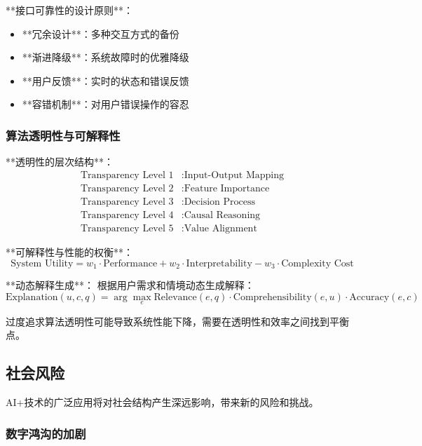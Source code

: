 **接口可靠性的设计原则**：
\begin{itemize}
\item **冗余设计**：多种交互方式的备份
\item **渐进降级**：系统故障时的优雅降级
\item **用户反馈**：实时的状态和错误反馈
\item **容错机制**：对用户错误操作的容忍
\end{itemize}

\subsubsection{算法透明性与可解释性} %

**透明性的层次结构**：
\begin{align}
\text{Transparency Level 1} &: \text{Input-Output Mapping} \\
\text{Transparency Level 2} &: \text{Feature Importance} \\
\text{Transparency Level 3} &: \text{Decision Process} \\
\text{Transparency Level 4} &: \text{Causal Reasoning} \\
\text{Transparency Level 5} &: \text{Value Alignment}
\end{align}

**可解释性与性能的权衡**：
\begin{equation}
\text{System Utility} = w_1 \cdot \text{Performance} + w_2 \cdot \text{Interpretability} - w_3 \cdot \text{Complexity Cost}
\end{equation}

**动态解释生成**：
根据用户需求和情境动态生成解释：
\begin{equation}
\text{Explanation}(u, c, q) = \arg\max_{e} \text{Relevance}(e, q) \cdot \text{Comprehensibility}(e, u) \cdot \text{Accuracy}(e, c)
\end{equation}

\begin{center}
过度追求算法透明性可能导致系统性能下降，需要在透明性和效率之间找到平衡点。
\end{center}

\subsection{社会风险}

AI+技术的广泛应用将对社会结构产生深远影响，带来新的风险和挑战。

\subsubsection{数字鸿沟的加剧} %

